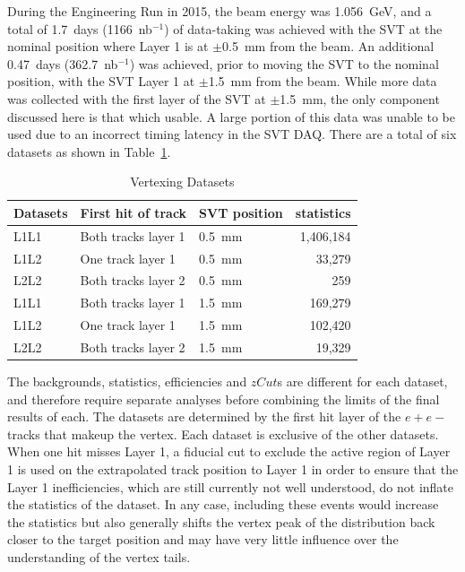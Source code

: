 \documentclass[twoside]{article}
\begin{document}
During the Engineering Run in 2015, the beam energy was 1.056~GeV, and a total of 1.7~days (1166~nb$^{-1}$) of data-taking was achieved with the SVT at the nominal position where Layer 1 is at $\pm$0.5~mm from the beam. An additional 0.47~days (362.7~nb$^{-1}$) was achieved, prior to moving the SVT to the nominal position, with the SVT Layer 1 at $\pm$1.5~mm from the beam. While more data was collected with the first layer of the SVT at $\pm$1.5~mm, the only component discussed here is that which usable. A large portion of this data was unable to be used due to an incorrect timing latency in the SVT DAQ. There are a total of six datasets as shown in Table~\ref{tab:datasets}.

\begin{table}[H]
\caption{Vertexing Datasets}
\label{tab:datasets}
\centering
\begin{tabular}{lllr}
\toprule
Datasets &First hit of track & SVT position & statistics \\
\midrule
L1L1 & Both tracks layer 1 & 0.5~mm & 1,406,184\\
L1L2 & One track layer 1 & 0.5~mm & 33,279\\
L2L2 & Both tracks layer 2 & 0.5~mm & 259\\
L1L1 & Both tracks layer 1 & 1.5~mm & 169,279\\
L1L2 & One track layer 1 & 1.5~mm & 102,420\\
L2L2 & Both tracks layer 2 & 1.5~mm & 19,329\\
\bottomrule
\end{tabular}
\end{table}

The backgrounds, statistics, efficiencies and $zCut$s are different for each dataset, and therefore require separate analyses before combining the limits of the final results of each. The datasets are determined by the first hit layer of the $e+e-$ tracks that makeup the vertex. Each dataset is exclusive of the other datasets. When one hit misses Layer 1, a fiducial cut to exclude the active region of Layer 1 is used on the extrapolated track position to Layer 1 in order to ensure that the Layer 1 inefficiencies, which are still currently not well understood, do not inflate the statistics of the dataset. In any case, including these events would increase the statistics but also generally shifts the vertex peak of the distribution back closer to the target position and may have very little influence over the understanding of the vertex tails. 
\end{document}

